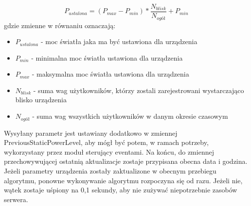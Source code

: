 \begin{equation}
P_{ustalona} = (P_{max} - P_{min}) * \frac{N_{blisk}}{N_{ogół}} + P_{min}
\end{equation}
gdzie zmienne w równaniu oznaczają:
\begin{itemize}
	\item $P_{ustalona}$ - moc światła jaka ma być ustawiona dla urządzenia
	\item $P_{min}$ - minimalna moc światła ustawiona dla urządzenia
	\item $P_{max}$ - maksymalna moc światła ustawiona dla urządzenia
	\item $N_{blisk}$ - suma wag użytkowników, którzy zostali zarejestrowani wystarczająco blisko urządzenia
	\item $N_{ogół}$ - suma wag wszystkich użytkowników w danym okresie czasowym
\end{itemize}
Wysyłany parametr jest ustawiany dodatkowo w zmiennej PreviousStaticPowerLevel, aby mógł być potem, w ramach potrzeby, wykorzystany przez moduł sterujący eventami. Na końcu, do zmiennej przechowywującej ostatnią aktualizacje zostaje przypisana obecna data i godzina.\\
Jeżeli parametry urządzenia zostały zaktualizone w obecnym przebiegu algorytmu, ponowne wykonywanie algorytmu rozpoczyna się od razu. Jeżeli nie, wątek zostaje uśpiony na 0,1 sekundy, aby nie zużywać niepotrzebnie zasobów serwera.
